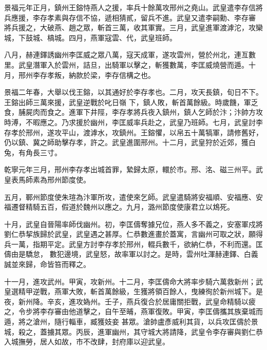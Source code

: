 
\begin{pinyinscope}

 景福元年正月，鎮州王鎔恃燕人之援，率兵十餘萬攻邢州之堯山。武皇遣李存信將兵應援，李存孝素與存信不協，遞相猜貳，留兵不進。武皇又遣李嗣勳、李存審
 將兵援之，大破燕、趙之眾，斬首三萬，收其軍實。三月，武皇進軍渡滹沱，攻欒城，下鼓城、槁城。四月，燕軍寇雲、代，武皇班師。



 八月，赫連鐸誘幽州李匡威之眾八萬，寇天成軍，遂攻雲州，營於州北，連亙數里。武皇潛軍入於雲州，詰旦，出騎軍以擊之，斬獲數萬，李匡威燒營而遁。十月，邢州李存孝叛，納款於梁，李存信構之也。



 景福二年春，大舉以伐王鎔，以其通好於李存孝也。二月，攻天長鎮，旬日不下。王鎔出師三萬來援，武皇逆戰於叱日嶺
 下，鎮人敗，斬首萬餘級。時歲饑，軍乏食，脯屍肉而食之。進軍下井陘，李存孝將兵夜入鎮州，鎮人乞師於汴；汴帥方攻時溥，不暇應之。乃求援於幽州，李匡威率兵赴之，武皇乃班師。七月，武皇討李存孝於邢州，遂攻平山，渡滹水，攻鎮州。王鎔懼，以帛五十萬犒軍，請修舊好，仍以鎮、冀之師助擊存孝，許之。武皇進圍邢州。十二月，武皇狩於近郊，獲白兔，有角長三寸。



 乾寧元年三月，邢州李存孝出城首罪，縶歸太原，轘於市。邢、洺、磁三州平。武
 皇表馬師素為邢州節度使。



 五月，鄆州節度使朱瑄為汴軍所攻，遣使來乞師。武皇遣騎將安福順、安福應、安福遷督精騎五百，假道於魏州以應之。九月，潞州節度使康君立以鴆死。



 十月，武皇自晉陽率師伐幽州。初，李匡儔奪據兄位，燕人多不義之，安塞軍戍將劉仁恭挈族歸於武皇，武皇遇之甚厚。仁恭數進畫於蓋寓，言幽州可取之狀，願得兵一萬，指期平定。武皇方討李存孝於邢州，輟兵數千，欲納仁恭，不利而還。匡儔由是驕怠，
 數犯邊境，武皇怒，故率軍以討之。是時，雲州吐渾赫連鐸、白義誠並來歸，命皆笞而釋之。



 十一月，進攻武州。甲寅，攻新州。十二月，李匡儔命大將率步騎六萬救新州；武皇選精甲逆戰，燕軍大敗，斬首萬餘級，生獲將領百餘人，曳練徇於新州城下。是夜，新州降。辛亥，進攻媯州。壬子，燕兵復合於居庸關拒戰，武皇命精騎以疲之，令步將李存審由他道擊之，自午至晡，燕軍復敗。甲寅，李匡儔攜其族棄城而遁，將之滄州，隨行輜車，臧獲妓妾
 甚眾。滄帥盧彥威利其貨，以兵攻匡儔於景城，殺之，蓋擄其眾。丙辰，進軍幽州，其守城大將請降，武皇令李存審與劉仁恭入城撫勞，居人如故，市不改肆，封府庫以迎武皇。




\end{pinyinscope}
